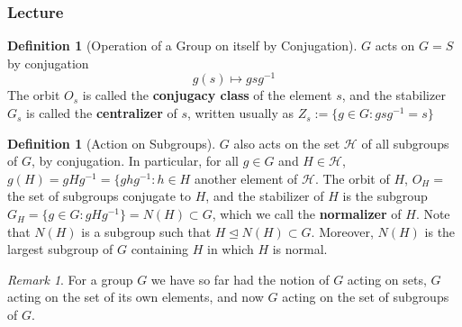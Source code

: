 \documentclass[12pt]{article}
\theoremstyle{definition}
\newtheorem{defn}[thm]{Definition}
\theoremstyle{remark}
\newtheorem{rmk}[thm]{Remark}
\numberwithin{equation}{section}
\newcommand\B[1]{\textbf{ #1}}
\newcommand\nsub{\trianglelefteq}
\begin{document}
\vspace{15pt}



\subsubsection{Lecture}

\begin{defn}[Operation of a Group on itself by Conjugation]
        $G$ acts on $G = S$ by conjugation \begin{equation}
                g(s)\mapsto gsg^{-1}
        \end{equation}
        The orbit $O_s$ is called the \B{conjugacy class} of the element $s$, and the stabilizer $G_s$ is called the \B{centralizer} of $s$, written usually as $Z_s := \{ g \in G: gsg^{-1} =s \}$
\end{defn}

\vspace{15pt}

\begin{defn}[Action on Subgroups]
        $G$ also acts on the set $\mathcal{H}$ of all subgroups of $G$, by conjugation. In particular, for all $g \in G$ and $H \in \mathcal{H}$, $g(H) = gHg^{-1} = \{ghg^{-1}: h \in H$ another element of $\mathcal{H}$. The orbit of $H$, $O_H = $ the set of subgroups conjugate to $H$, and the stabilizer of $H$ is the subgroup $G_H = \{g \in G: gHg^{-1}\} = N(H) \subset G$, which we call the \B{normalizer} of $H$. Note that $N(H)$ is a subgroup such that $H \nsub N(H) \subset G$. Moreover, $N(H)$ is the largest subgroup of $G$ containing $H$ in which $H$ is normal.
\end{defn}

\vspace{15pt}

\begin{rmk}
        For a group $G$ we have so far had the notion of $G$ acting on sets, $G$ acting on the set of its own elements, and now $G$ acting on the set of subgroups of $G$.
\end{rmk}


\vspace{15pt}
\end{document}
